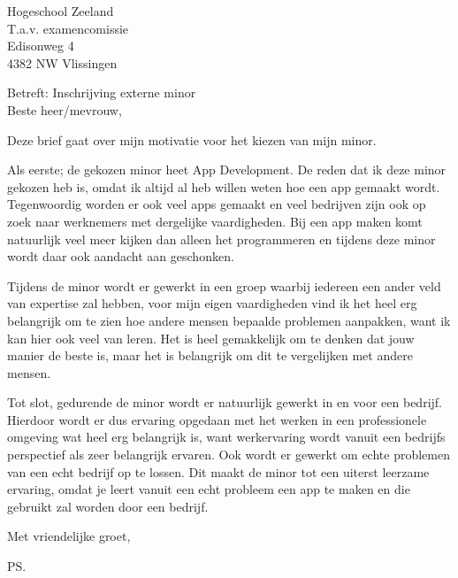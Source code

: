 \documentclass{letter}
\begin{document}
\begin{letter}{Hogeschool Zeeland \\ T.a.v. examencomissie \\ Edisonweg 4 \\ 4382 NW Vlissingen}

\opening{Betreft: Inschrijving externe minor \newline \\ Beste heer/mevrouw,}

Deze brief gaat over mijn motivatie voor het kiezen van mijn minor.

Als eerste; de gekozen minor heet App Development. De reden dat ik deze minor gekozen heb is, omdat ik altijd al heb willen weten hoe een app gemaakt wordt. Tegenwoordig worden er ook veel apps gemaakt en veel bedrijven zijn ook op zoek naar werknemers met dergelijke vaardigheden. Bij een app maken komt natuurlijk veel meer kijken dan alleen het programmeren en tijdens deze minor wordt daar ook aandacht aan geschonken.

\newline

Tijdens de minor wordt er gewerkt in een groep waarbij iedereen een ander veld van expertise zal hebben, voor mijn eigen vaardigheden vind ik het heel erg belangrijk om te zien hoe andere mensen bepaalde problemen aanpakken, want ik kan hier ook veel van leren. Het is heel gemakkelijk om te denken dat jouw manier de beste is, maar het is belangrijk om dit te vergelijken met andere mensen.

\newline

Tot slot, gedurende de minor wordt er natuurlijk gewerkt in en voor een bedrijf. Hierdoor wordt er dus ervaring opgedaan met het werken in een professionele omgeving wat heel erg belangrijk is, want werkervaring wordt vanuit een bedrijfs perspectief als zeer belangrijk ervaren. Ook wordt er gewerkt om echte problemen van een echt bedrijf op te lossen. Dit maakt de minor tot een uiterst leerzame ervaring, omdat je leert vanuit een echt probleem een app te maken en die gebruikt zal worden door een bedrijf.


\closing{Met vriendelijke groet, }
\ps

\end{letter}
\end{document}
